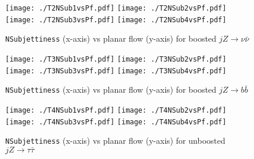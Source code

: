 \begin{figure}[H]
    \begin{center}
        \texttt{[image: ./T2NSub1vsPf.pdf]}
        \texttt{[image: ./T2NSub2vsPf.pdf]}\\
        \texttt{[image: ./T2NSub3vsPf.pdf]}
        \texttt{[image: ./T2NSub4vsPf.pdf]}\\
        \caption{ {\tt NSubjettiness} (x-axis) vs planar flow (y-axis) for boosted $jZ\rightarrow \nu \bar{\nu}$ }
        \label{fig:nsubvspf2}
    \end{center}
\end{figure}

\begin{figure}[H]
    \begin{center}
        \texttt{[image: ./T3NSub1vsPf.pdf]}
        \texttt{[image: ./T3NSub2vsPf.pdf]}\\
        \texttt{[image: ./T3NSub3vsPf.pdf]}
        \texttt{[image: ./T3NSub4vsPf.pdf]}\\
        \caption{ {\tt NSubjettiness} (x-axis) vs planar flow (y-axis) for boosted $jZ\rightarrow b \bar{b}$ }
        \label{fig:nsubvspf3}
    \end{center}
\end{figure}

\begin{figure}[H]
    \begin{center}
        \texttt{[image: ./T4NSub1vsPf.pdf]}
        \texttt{[image: ./T4NSub2vsPf.pdf]}\\
        \texttt{[image: ./T4NSub3vsPf.pdf]}
        \texttt{[image: ./T4NSub4vsPf.pdf]}\\
        \caption{ {\tt NSubjettiness} (x-axis) vs planar flow (y-axis) for unboosted $jZ\rightarrow \tau \bar{\tau}$ }
        \label{fig:nsubvspf4}
    \end{center}
\end{figure}